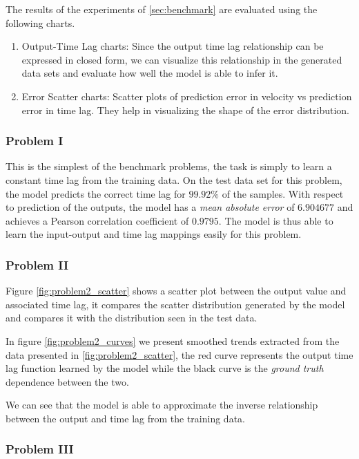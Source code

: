 \documentclass[twoside]{article}
\begin{document}
The results of the experiments of \ref{sec:benchmark} are evaluated using the following charts.

\begin{enumerate}
    \item Output-Time Lag charts: Since the output time lag relationship can be expressed in closed form, we can visualize this relationship in the generated data sets and evaluate how well the model is able to infer it.
    \item Error Scatter charts: Scatter plots of prediction error in velocity vs prediction error in time lag. They help in visualizing the shape of the error distribution.
\end{enumerate}


\subsubsection{Problem I}

This is the simplest of the benchmark problems, the task is simply to learn a constant time lag from the training data. On the test data set for this problem, the model predicts the correct time lag for $99.92\%$ of the samples. With respect to prediction of the outputs, the model has a \emph{mean absolute error} of $6.904677$ and achieves a Pearson correlation coefficient of $0.9795$. The model is thus able to learn the input-output and time lag mappings easily for this problem.

\subsubsection{Problem II}

Figure \ref{fig:problem2_scatter} shows a scatter plot between the output value and associated time lag, it compares the scatter distribution generated by the model and compares it with the distribution seen in the test data. 

In figure \ref{fig:problem2_curves} we present smoothed trends extracted from the data presented in \ref{fig:problem2_scatter}, the red curve represents the output time lag function learned by the model while the black curve is the \emph{ground truth} dependence between the two. 

We can see that the model is able to approximate the inverse relationship between the output and time lag from the training data.

\subsubsection{Problem III}
\end{document}
